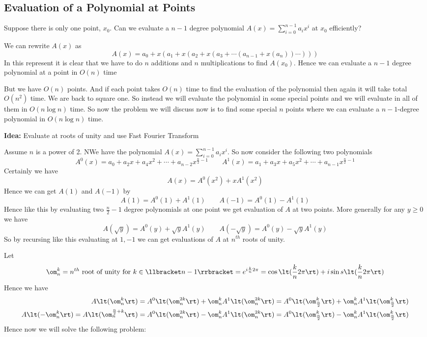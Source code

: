 \subsection{Evaluation of a Polynomial at Points}\label{fft}
\begin{question}{}{}
	Suppose there is only one point, $x_0$. Can we evaluate a $n-1$ degree polynomial $A(x)=\sum\limits_{i=0}^{n-1}a_ix^i$ at $x_0$ efficiently?
\end{question}
We can rewrite $A(x)$ as $$A(x)=a_0+x(a_1+x(a_2+x(a_3+\cdots (a_{n-1}+x(a_n))\cdots )))$$In this represent it is clear that we have to do $n$ additions and $n$ multiplications to find $A(x_0)$. Hence we can evaluate a $n-1$ degree polynomial at a point in $O(n)$ time


But we have $O(n)$ points. And if each point takes $O(n)$ time to find the evaluation of the polynomial then again it will take total $O(n^2)$ time. We are back to square one. So instead we will evaluate the polynomial in some special points and we will evaluate in all of them in $O(n\log n)$ time. So now the problem we will discuss now is to find some special $n$ points where we can evaluate a $n-1$-degree polynomial in $O(n\log n)$ time.
\parinf

\textbf{Idea:} Evaluate at roots of unity and use Fast Fourier Transform
\parinn

Assume $n$ is a power of 2. NWe have the polynomial $A(x)=\sum\limits_{i=0}^{n-1}a_ix^i$. So now consider the following two polynomials $$A^0(x)=a_0+a_2x+a_4x^2+\cdots+a_{n-2}x^{\frac{n}2-1}\qquad A^1(x)=a_1+a_3x+a_5x^2+\cdots+a_{n-1}x^{\frac{n}2-1}$$Certainly we have $$A(x)=A^0(x^2)+xA^1(x^2)$$Hence we can get $A(1)$ and $A(-1)$ by $$A(1)=A^0(1)+A^1(1)\qquad A(-1)=A^0(1)-A^1(1)$$Hence like this by evaluating two $\frac{n}2-1$ degree polynomials at one point we get evaluation of $A$ at two points. More generally for any $y\geq 0$ we have$$A(\sqrt{y})=A^0(y)+\sqrt{y}A^1(y)\qquad A(-\sqrt{y})=A^0(y)-\sqrt{y}A^1(y)$$So by recursing like this evaluating at $1,-1$ we can get evaluations of $A$ at $n^{th}$ roots of unity.

Let $$\om_n^k=n^{th}\text{ root of unity for }k\in\llbracket n-1\rrbracket = e^{i\frac{k}{n}2\pi}=\cos\lt(\frac{k}{n}2\pi\rt)+i\sin s\lt(\frac{k}{n}2\pi\rt)$$Hence we have \begin{align*}
	A\lt(\om_n^k\rt)&=A^0\lt(\om_n^{2k}\rt)+\om_n^kA^1\lt(\om_n^{2k}\rt)=A^0\lt(\om_{\frac{n}2}^{k}\rt)+\om_n^kA^1\lt(\om_{\frac{n}2}^{k}\rt)\\
	A\lt(-\om_n^k\rt)=A\lt(\om_n^{\frac{n}2+k}\rt)&=A^0\lt(\om_n^{2k}\rt)-\om_n^kA^1\lt(\om_n^{2k}\rt)=A^0\lt(\om_{\frac{n}2}^{k}\rt)-\om_n^kA^1\lt(\om_{\frac{n}2}^{k}\rt)
\end{align*}Hence now we will solve the following problem:
\begin{algoprob}
\end{algoprob}

